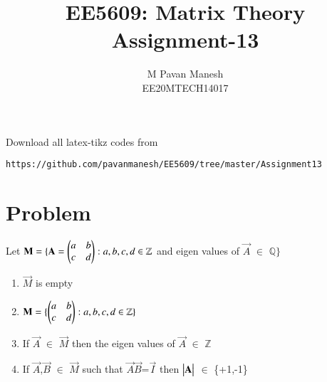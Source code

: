 \documentclass[journal,12pt,twocolumn]{IEEEtran}
\begin{document}
     \def\rightbox#1{\makebox[0in][r]{#1}}
     \def\centbox#1{\makebox[0in]{#1}}
     \def\topbox#1{\raisebox{-\baselineskip}[0in][0in]{#1}}
     \def\midbox#1{\raisebox{-0.5\baselineskip}[0in][0in]{#1}}
\vspace{3cm}
\title{EE5609: Matrix Theory\\
          Assignment-13\\}
\author{M Pavan Manesh\\
EE20MTECH14017 }
\maketitle
\newpage
\bigskip
\renewcommand{\thefigure}{\theenumi}
\renewcommand{\thetable}{\theenumi}
Download all latex-tikz codes from 
%
\begin{lstlisting}
https://github.com/pavanmanesh/EE5609/tree/master/Assignment13
\end{lstlisting}
%
\section{Problem}
Let $\mathbf{M} =\{\mathbf{A}=\begin{pmatrix}a&b\\c&d\end{pmatrix} : a,b,c,d \in \mathbb{Z} $ and eigen values of $\vec{A}$ $\in$ $\mathbb{Q}$$\}$ \label{main}
\begin{enumerate}
    \item $\vec{M}$ is empty
    \item $\mathbf{M} =\{\begin{pmatrix}a&b\\c&d\end{pmatrix} : a,b,c,d \in \mathbb{Z} \}$
    \item If $\vec{A}$ $\in$ $\vec{M}$ then the eigen values of $\vec{A}$ $\in$ $\mathbb{Z}$
    \item If $\vec{A}$,$\vec{B}$ $\in$ $\vec{M}$ such that $\vec{A} \vec{B}$=$\vec{I}$ then $\begin{vmatrix}\mathbf{A}\end{vmatrix}$ $\in$ \{+1,-1\}
\end{enumerate}
\end{document}
